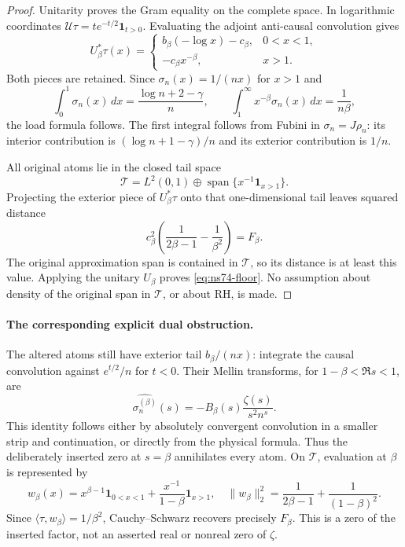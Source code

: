 \documentclass[11pt]{article}
\theoremstyle{remark}
\begin{document}
\begin{proof}
Unitarity proves the Gram equality on the complete space. In logarithmic
coordinates $\mathcal U\tau=t e^{-t/2}\mathbf1_{t>0}$.
Evaluating the adjoint anti-causal convolution gives
\[
 U_\beta^*\tau(x)=
 \begin{cases}
 b_\beta(-\log x)-c_\beta,&0<x<1,\\
 -c_\beta x^{-\beta},&x>1.
 \end{cases}
\]
Both pieces are retained. Since $\sigma_n(x)=1/(nx)$ for $x>1$ and
\[
 \int_0^1\sigma_n(x)\,dx=\frac{\log n+2-\gamma}{n},
 \qquad \int_1^\infty x^{-\beta}\sigma_n(x)\,dx=\frac1{n\beta},
\]
the load formula follows. The first integral follows from Fubini in
$\sigma_n=J\rho_n$: its interior contribution is
$(\log n+1-\gamma)/n$ and its exterior contribution is $1/n$.

All original atoms lie in the closed tail space
\[
 \mathcal T=L^2(0,1)\oplus
              \operatorname{span}\{x^{-1}\mathbf1_{x>1}\}.
\]
Projecting the exterior piece of $U_\beta^*\tau$ onto that one-dimensional
tail leaves squared distance
\[
 c_\beta^2\left(\frac1{2\beta-1}-\frac1{\beta^2}\right)
 =F_\beta.
\]
The original approximation span is contained in $\mathcal T$, so its
distance is at least this value. Applying the unitary $U_\beta$ proves
\eqref{eq:ns74-floor}. No assumption about density of the original span
in $\mathcal T$, or about RH, is made.
\end{proof}

\paragraph{The corresponding explicit dual obstruction.}
The altered atoms still have exterior tail $b_\beta/(nx)$: integrate the
causal convolution against $e^{t/2}/n$ for $t<0$.
Their Mellin transforms, for $1-\beta<\Re s<1$, are
\[
 \widehat{\sigma_n^{(\beta)}}(s)
     =-B_\beta(s)\frac{\zeta(s)}{s^2n^s}.
\]
This identity follows either by absolutely convergent convolution in a
smaller strip and continuation, or directly from the physical formula.
Thus the deliberately inserted zero at $s=\beta$ annihilates every atom.
On $\mathcal T$, evaluation at $\beta$ is represented by
\[
 w_\beta(x)=x^{\beta-1}\mathbf1_{0<x<1}
          +\frac{x^{-1}}{1-\beta}\mathbf1_{x>1},
 \quad
 \|w_\beta\|_2^2=\frac1{2\beta-1}+\frac1{(1-\beta)^2}.
\]
Since $\langle\tau,w_\beta\rangle=1/\beta^2$, Cauchy--Schwarz
recovers precisely $F_\beta$. This is a zero of the inserted factor,
not an asserted real or nonreal zero of $\zeta$.
\end{document}
